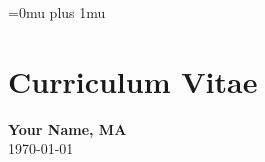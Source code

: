 \documentclass[12pt, letterpaper]{report}   %
\begin{document}




\newpage
\singlespace
\Urlmuskip=0mu plus 1mu\relax %




\chapter*{Curriculum Vitae}
\thispagestyle{empty}
\begin{large}
\begin{center}
\textbf{Your Name, MA}\\
\today\\
\end{center}
\end{large}
\end{document}
